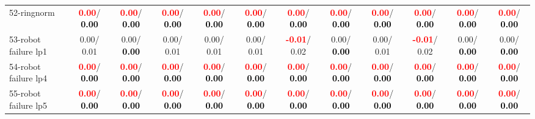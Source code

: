 \begin{table}[h]
\begin{center}
{\begin{tabular}{lc|c|c|c|c|c|c|c|c|c|c}
52-ringnorm & \textcolor{red}{\textbf{  0.00}}/\textcolor{black}{\textbf{  0.00}} & \textcolor{red}{\textbf{  0.00}}/\textcolor{black}{\textbf{  0.00}} & \textcolor{red}{\textbf{  0.00}}/\textcolor{black}{\textbf{  0.00}} & \textcolor{red}{\textbf{  0.00}}/\textcolor{black}{\textbf{  0.00}} & \textcolor{red}{\textbf{  0.00}}/\textcolor{black}{\textbf{  0.00}} & \textcolor{red}{\textbf{  0.00}}/\textcolor{black}{\textbf{  0.00}} & \textcolor{red}{\textbf{  0.00}}/\textcolor{black}{\textbf{  0.00}} & \textcolor{red}{\textbf{  0.00}}/\textcolor{black}{\textbf{  0.00}} & \textcolor{red}{\textbf{  0.00}}/\textcolor{black}{\textbf{  0.00}} & \textcolor{red}{\textbf{  0.00}}/\textcolor{black}{\textbf{  0.00}} & \textcolor{red}{\textbf{  0.00}}/\textcolor{black}{\textbf{  0.00}} \\
53-robot failure lp1 &   0.00/  0.01 &   0.00/\textcolor{black}{\textbf{  0.00}} &   0.00/  0.01 &   0.00/  0.01 &   0.00/  0.01 & \textcolor{red}{\textbf{ -0.01}}/  0.02 &   0.00/\textcolor{black}{\textbf{  0.00}} &   0.00/  0.01 & \textcolor{red}{\textbf{ -0.01}}/  0.02 &   0.00/\textcolor{black}{\textbf{  0.00}} &   0.00/\textcolor{black}{\textbf{  0.00}} \\ \hline
54-robot failure lp4 & \textcolor{red}{\textbf{  0.00}}/\textcolor{black}{\textbf{  0.00}} & \textcolor{red}{\textbf{  0.00}}/\textcolor{black}{\textbf{  0.00}} & \textcolor{red}{\textbf{  0.00}}/\textcolor{black}{\textbf{  0.00}} & \textcolor{red}{\textbf{  0.00}}/\textcolor{black}{\textbf{  0.00}} & \textcolor{red}{\textbf{  0.00}}/\textcolor{black}{\textbf{  0.00}} & \textcolor{red}{\textbf{  0.00}}/\textcolor{black}{\textbf{  0.00}} & \textcolor{red}{\textbf{  0.00}}/\textcolor{black}{\textbf{  0.00}} & \textcolor{red}{\textbf{  0.00}}/\textcolor{black}{\textbf{  0.00}} & \textcolor{red}{\textbf{  0.00}}/\textcolor{black}{\textbf{  0.00}} & \textcolor{red}{\textbf{  0.00}}/\textcolor{black}{\textbf{  0.00}} & \textcolor{red}{\textbf{  0.00}}/\textcolor{black}{\textbf{  0.00}} \\
55-robot failure lp5 & \textcolor{red}{\textbf{  0.00}}/\textcolor{black}{\textbf{  0.00}} & \textcolor{red}{\textbf{  0.00}}/\textcolor{black}{\textbf{  0.00}} & \textcolor{red}{\textbf{  0.00}}/\textcolor{black}{\textbf{  0.00}} & \textcolor{red}{\textbf{  0.00}}/\textcolor{black}{\textbf{  0.00}} & \textcolor{red}{\textbf{  0.00}}/\textcolor{black}{\textbf{  0.00}} & \textcolor{red}{\textbf{  0.00}}/\textcolor{black}{\textbf{  0.00}} & \textcolor{red}{\textbf{  0.00}}/\textcolor{black}{\textbf{  0.00}} & \textcolor{red}{\textbf{  0.00}}/\textcolor{black}{\textbf{  0.00}} & \textcolor{red}{\textbf{  0.00}}/\textcolor{black}{\textbf{  0.00}} & \textcolor{red}{\textbf{  0.00}}/\textcolor{black}{\textbf{  0.00}} & \textcolor{red}{\textbf{  0.00}}/\textcolor{black}{\textbf{  0.00}} \\

\end{tabular}}
\end{center}
\end{table}
